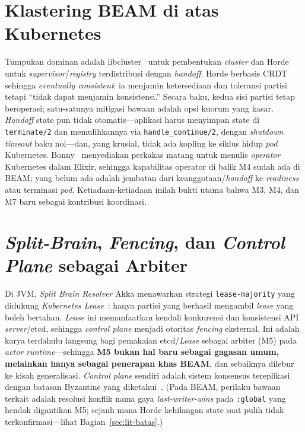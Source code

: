 \section{Klastering BEAM di atas Kubernetes}
\label{sec:lit-beam}
Tumpukan dominan adalah libcluster~\cite{libcluster} untuk pembentukan \emph{cluster} dan
Horde~\cite{horde} untuk \emph{supervisor}/\emph{registry} terdistribusi dengan
\emph{handoff}. Horde berbasis CRDT sehingga \emph{eventually consistent}: ia menjamin
ketersediaan dan toleransi partisi tetapi ``tidak dapat menjamin konsistensi.'' Secara
baku, kedua sisi partisi tetap beroperasi; satu-satunya mitigasi bawaan adalah opsi kuorum
yang kasar. \emph{Handoff} state pun tidak otomatis---aplikasi harus menyimpan state di
\texttt{terminate/2} dan memulihkannya via \texttt{handle\_continue/2}, dengan
\emph{shutdown timeout} baku nol---dan, yang krusial, tidak ada kopling ke siklus hidup
\emph{pod} Kubernetes. Bonny~\cite{bonny} menyediakan perkakas matang untuk menulis
\emph{operator} Kubernetes dalam Elixir, sehingga kapabilitas operator di balik M4 sudah
ada di BEAM; yang belum ada adalah jembatan dari keanggotaan/\emph{handoff} ke
\emph{readiness} atau terminasi \emph{pod}. Ketiadaan-ketiadaan inilah bukti utama bahwa
M3, M4, dan M7 baru sebagai kontribusi koordinasi.

\section{\emph{Split-Brain}, \emph{Fencing}, dan \emph{Control Plane} sebagai Arbiter}
\label{sec:lit-splitbrain}
Di JVM, \emph{Split Brain Resolver} Akka menawarkan strategi \texttt{lease-majority} yang
didukung \emph{Kubernetes Lease}~\cite{akkaSBR,akkaLease}: hanya partisi yang berhasil
mengambil \emph{lease} yang boleh bertahan. \emph{Lease} ini memanfaatkan kendali
konkurensi dan konsistensi API \emph{server}/etcd, sehingga \emph{control plane} menjadi
otoritas \emph{fencing} eksternal. Ini adalah karya terdahulu langsung bagi pemakaian
etcd/\emph{Lease} sebagai arbiter (M5) pada \emph{actor runtime}---sehingga \textbf{M5
bukan hal baru sebagai gagasan umum, melainkan hanya sebagai penerapan khas BEAM}, dan
sebaiknya dilebur ke kisah generalisasi. \emph{Control plane} sendiri adalah sistem
konsensus tereplikasi dengan batasan Byzantine yang diketahui~\cite{byzK8s}. (Pada BEAM,
perilaku bawaan terkait adalah resolusi konflik nama gaya \emph{last-writer-wins} pada
\texttt{:global} yang hendak digantikan M5; sejauh mana Horde kehilangan state saat pulih
tidak terkonfirmasi---lihat Bagian~\ref{sec:lit-batas}.)

